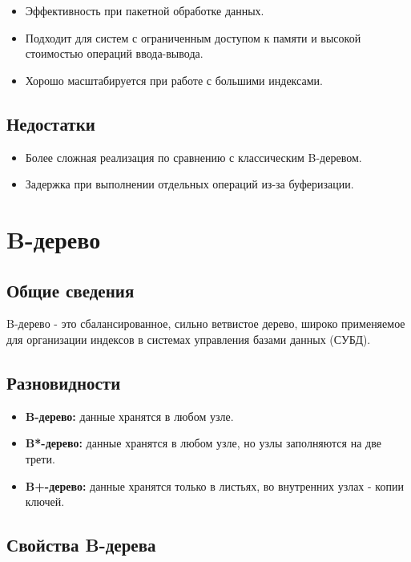 {\begin{itemize}
  \item Эффективность при пакетной обработке данных.
  \item Подходит для систем с ограниченным доступом к памяти и высокой стоимостью операций ввода-вывода.
  \item Хорошо масштабируется при работе с большими индексами.
\end{itemize}

\subsection*{Недостатки}

\begin{itemize}
  \item Более сложная реализация по сравнению с классическим B-деревом.
  \item Задержка при выполнении отдельных операций из-за буферизации.
\end{itemize}



	\section*{B-дерево}

\subsection*{Общие сведения}

B-дерево - это сбалансированное, сильно ветвистое дерево, широко применяемое для организации индексов в системах управления базами данных (СУБД).

\subsection*{Разновидности}

\begin{itemize}
  \item \textbf{B-дерево:} данные хранятся в любом узле.
  \item \textbf{B*-дерево:} данные хранятся в любом узле, но узлы заполняются на две трети.
  \item \textbf{B+-дерево:} данные хранятся только в листьях, во внутренних узлах - копии ключей.
\end{itemize}

\subsection*{Свойства B-дерева}

}
